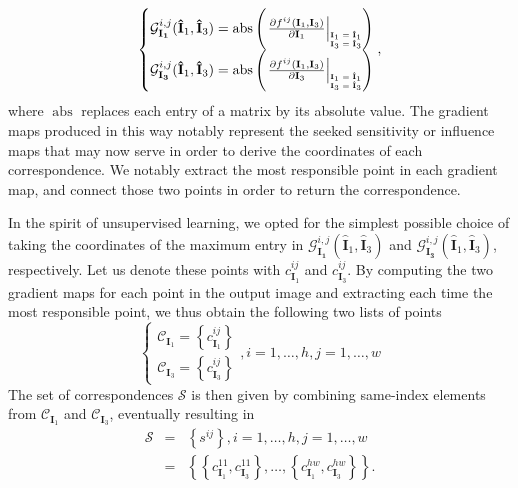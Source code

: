 \documentclass[runningheads]{llncs}
\begin{document}
	\begin{equation}
		\left\{ \begin{matrix}
			\mathcal{G}^{i,j}_{\mathbf{I_{1}}}(\mathbf{\hat{I}}_{1},\mathbf{\hat{I}}_{3}) = \operatorname{abs} \left( \left. \frac{\partial f^{ij}(\mathbf{I}_{1},\mathbf{I}_{3})}{\partial \mathbf{I}_{1}} \right|_{ \tiny{\begin{matrix} \mathbf{I}_{1}=\mathbf{\hat{I}}_{1} \\ \mathbf{I}_{3}=\mathbf{\hat{I}}_{3} \end{matrix} } } \right) \\
			\mathcal{G}^{i,j}_{\mathbf{I_{3}}}(\mathbf{\hat{I}}_{1},\mathbf{\hat{I}}_{3}) = \operatorname{abs} \left( \left. \frac{\partial f^{ij}(\mathbf{I}_{1},\mathbf{I}_{3})}{\partial \mathbf{I}_{3}} \right|_{ \tiny{\begin{matrix} \mathbf{I}_{1}=\mathbf{\hat{I}}_{1} \\ \mathbf{I}_{3}=\mathbf{\hat{I}}_{3} \end{matrix} } } \right)
		\end{matrix} \right. ,
	\end{equation}
	where $\operatorname{abs}$ replaces each entry of a matrix by its absolute value. The gradient maps produced in this way notably represent the seeked sensitivity or influence maps that may now serve in order to derive the coordinates of each correspondence. We notably extract the most responsible point in each gradient map, and connect those two points in order to return the correspondence.
	
	In the spirit of unsupervised learning, we opted for the simplest possible choice of taking the coordinates of the maximum entry in $\mathcal{G}^{i,j}_{\mathbf{I_{1}}}(\mathbf{\hat{I}}_{1},\mathbf{\hat{I}}_{3})$ and $ \mathcal{G}^{i,j}_{\mathbf{I_{3}}}(\mathbf{\hat{I}}_{1},\mathbf{\hat{I}}_{3})$, respectively. Let us denote these points with $c^{ij}_{\mathbf{I}_{1}}$ and $c^{ij}_{\mathbf{I}_{3}}$. By computing the two gradient maps for each point in the output image and extracting each time the most responsible point, we thus obtain the following two lists of points
	\begin{equation}
		\left\{ \begin{matrix}
			\mathcal{C}_{\mathbf{I}_{1}} = \left\{  c^{ij}_{\mathbf{I}_{1}} \right\}\\
			\mathcal{C}_{\mathbf{I}_{3}} = \left\{  c^{ij}_{\mathbf{I}_{3}} \right\}
		\end{matrix}\right. , i=1,\ldots,h, j=1,\ldots,w
	\end{equation}
	The set of correspondences $\mathcal{S}$ is then given by combining same-index elements from $\mathcal{C}_{\mathbf{I}_{1}}$ and $\mathcal{C}_{\mathbf{I}_{3}}$, eventually resulting in
	\begin{eqnarray}
		\mathcal{S} & = & \left\{ s^{ij} \right\}, i=1,\ldots,h, j=1,\ldots,w \nonumber \\
		& = & \left\{ \left\{c^{11}_{\mathbf{I}_{1}}, c^{11}_{\mathbf{I}_{3}} \right\}, \ldots, \left\{c^{hw}_{\mathbf{I}_{1}}, c^{hw}_{\mathbf{I}_{3}} \right\} \right\}.
	\end{eqnarray}			
				    
\end{document}
